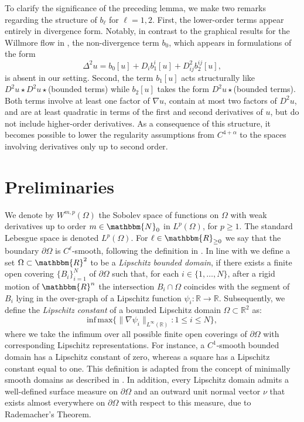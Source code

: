 \documentclass[12pt,a4paper,twoside]{article}
\newcommand{\R}{\mathbbm {R}}
\newcommand{\N}{\mathbbm {N}}
\begin{document}
To clarify the significance of the preceding lemma, we make two remarks regarding the structure of $b_{\ell}$ for $\ell=1,2$. First, the lower-order terms appear entirely in divergence form. Notably, in contrast to the graphical results for the Willmore flow in \cite{koch2012geometric}, the non-divergence term $b_0$, which appears in formulations of the form
\[\Delta^2 u = b_0[u] + D_{i} b^{i}_1[u] + D^2_{ij} b^{ij}_2[u] , \] is absent in our setting.
Second, the term $b_1[u]$ acts structurally like $D^2u\star D^2u \star {}$(bounded terms) while  $b_2[u]$ takes the form $D^2u\star{}$(bounded terms).  Both terms involve at least one factor of $\nabla u$, contain at most two factors of $D^2u$, and are at least quadratic in terms of the first and second derivatives of $u$, but do not include higher-order derivatives. As a consequence of this structure, it becomes possible to lower the regularity assumptions from $C^{4+\alpha}$ to the spaces involving derivatives only up to second order.

\section{Preliminaries}
\label{sec:weightsob}

We denote by $W^{m,p}(\Omega)$ the Sobolev space of functions on $\Omega$ with weak derivatives up to order $m\in \N_0$ in $L^p(\Omega)$, for $p\ge 1$. The standard Lebesgue space is denoted  $L^p(\Omega)$.
 For $\ell\in\R_{\ge0}$ we say that the boundary $\partial\Omega$ is $C^\ell$-smooth, following the definition in  \cite[p. 94 Subsection 6.2]{gilbarg2001elliptic}. 
In line with \cite[Subsection 6.1]{maz2010dirichlet} we define a set $\Omega\subset\R^2$ to be a \emph{Lipschitz bounded domain}, if there exists a finite open covering $\{B_i\}_{i=1}^N$ of $\partial\Omega$ such that, for each $i \in \{1, \ldots, N\}$, after a rigid motion of $\R^n$ the intersection $B_i\cap\Omega$ coincides with the segment of $B_i$ lying in the over-graph of a Lipschitz function $\psi_i \colon \mathbb{R} \to \mathbb{R}$. Subsequently, we define the \emph{Lipschitz constant} of a bounded Lipschitz domain $\Omega \subset \mathbb{R}^2$ as:
\begin{equation}
    \text{inf}\, \text{max} \{ \|\nabla \psi_i\|_{L^\infty(\mathbb{R})} : 1 \leq i \leq N \}, 
\end{equation}
where we take the infimum over all possible finite open coverings of $\partial\Omega$ with corresponding Lipschitz representations. For instance,  a $C^1$-smooth bounded domain has a Lipschitz constant of zero, whereas a square has a Lipschitz constant equal to one. This definition is adapted from the concept of minimally smooth domains as described in \cite[Subsection 3.3 p 189]{stein1970singular}. In addition, every Lipschitz domain admits a well-defined surface measure on $\partial\Omega$ and an outward unit normal vector $\nu$ that exists almost everywhere on $\partial\Omega$ with respect to this measure, due to Rademacher's Theorem.
\end{document}
